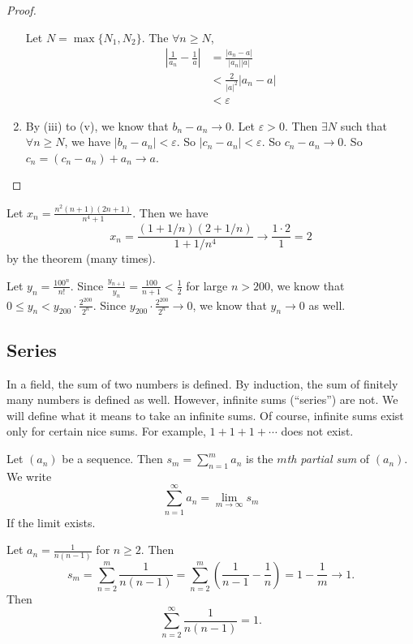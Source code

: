 \documentclass[a4paper]{article}
\begin{document}
\begin{proof}
\begin{enumerate}
      Let $N = \max\{N_1, N_2\}$. The $\forall n \geq N$,
      \begin{align*}
        \left|\frac{1}{a_n} - \frac{1}{a}\right| &= \frac{|a_n - a|}{|a_n||a|}\\
        &< \frac{2}{|a|^2}|a_n - a|\\
        &< \varepsilon
      \end{align*}
    \item By (iii) to (v), we know that $b_n - a_n \to 0$. Let $\varepsilon > 0$. Then $\exists N$ such that $\forall n\geq N$, we have $|b_n - a_n| < \varepsilon$. So $|c_n - a_n| < \varepsilon$. So $c_n - a_n \to 0$. So $c_n = (c_n - a_n) + a_n \to a$.
  \end{enumerate}
\end{proof}

\begin{eg}
  Let $x_n = \frac{n^2(n + 1)(2n + 1)}{n^4 + 1}$. Then we have
  \[
    x_n = \frac{(1 + 1/n)(2 + 1/n)}{1 + 1/n^4}\to \frac{1\cdot 2}{1} = 2
  \]
  by the theorem (many times).
\end{eg}

\begin{eg}
  Let $y_n = \frac{100^n}{n!}$. Since $\frac{y_{n + 1}}{y_n} = \frac{100}{n + 1} < \frac{1}{2}$ for large $n > 200$, we know that $0 \leq y_n < y_{200}\cdot \frac{2^{200}}{2^n}$. Since $y_{200}\cdot \frac{2^{200}}{2^n} \to 0$, we know that $y_n\to 0$ as well.
\end{eg}

\subsection{Series}
In a field, the sum of two numbers is defined. By induction, the sum of finitely many numbers is defined as well. However, infinite sums (``series'') are not. We will define what it means to take an infinite sums. Of course, infinite sums exist only for certain nice sums. For example, $1 + 1 + 1 + \cdots$ does not exist.

\begin{defi}
  Let $(a_n)$ be a sequence. Then $s_m = \sum_{n = 1}^m a_n$ is the \emph{$m$th partial sum} of $(a_n)$. We write
  \[
    \sum_{n = 1}^\infty a_n = \lim_{m\to \infty} s_m
  \]
  If the limit exists.
\end{defi}

\begin{eg}
  Let $a_n = \frac{1}{n(n - 1)}$ for $n\geq 2$. Then
  \[
    s_m = \sum_{n = 2}^m \frac{1}{n(n - 1)} = \sum_{n = 2}^m\left(\frac{1}{n - 1} - \frac{1}{n}\right) = 1 - \frac{1}{m}\to 1.
  \]
  Then
  \[
    \sum_{n = 2}^\infty \frac{1}{n(n - 1)} = 1.
  \]
\end{eg}
\end{document}
